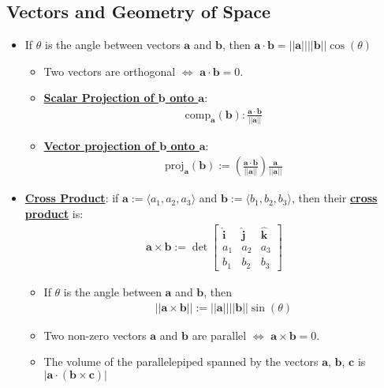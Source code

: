 \documentclass[reqno,11pt]{amsart}
\theoremstyle{definition}
\theoremstyle{remark}
\newcommand{\dfn}[1]{\underline{\textbf{#1}}}
\begin{document}
\subsection{Vectors and Geometry of Space}
\begin{itemize}[noitemsep]
	\item If $\theta$ is the angle between vectors $\mathbf{a}$ and $\mathbf{b}$, then $\mathbf{a} \cdot \mathbf{b} = ||\mathbf{a}|| || \mathbf{b} || \cos (\theta)$ 
	\begin{itemize}[noitemsep]
		\item Two vectors are orthogonal $\iff$ $\mathbf{a} \cdot \mathbf{b} = 0$. 
		\item \dfn{Scalar Projection of $\mathbf{b}$ onto $\mathbf{a}$}: 
		\begin{align}
			\text{comp}_{ \mathbf{a}} ( \mathbf{b}) : \frac{\mathbf{a} \cdot \mathbf{b} }{||\mathbf{a}|| }	
		\end{align}
		\item \dfn{Vector projection of $\mathbf{b}$ onto $\mathbf{a}$}: 
		\begin{align}
			\text{proj}_{\mathbf{a}} (\mathbf{b}) 	:= \left( \frac{\mathbf{a} \cdot \mathbf{b}}{|| \mathbf{a}|| } \right) \frac{\mathbf{a}}{|| \mathbf{a}||}
		\end{align}
	\end{itemize}
	\item \dfn{Cross Product}: if $\mathbf{a} := \langle a_1, a_2, a_3 \rangle$ and $\mathbf{b} := \langle b_1, b_2, b_3 \rangle$, then their \dfn{cross product} is:
	\begin{align}
		\mathbf{a} \times \mathbf{b} := \det \begin{bmatrix}
			\mathbf{\hat{i}} & \mathbf{\hat{j}} & \mathbf{\hat{k}} \\
			a_1 & a_2 & a_3 \\
			b_1 & b_2 & b_3 
		\end{bmatrix}	
	\end{align}	
	\begin{itemize}[noitemsep]
		\item If $\theta$ is the angle between $\mathbf{a}$ and $\mathbf{b}$, then 
		\begin{align}
			||\mathbf{a} \times \mathbf{b} || := || \mathbf{a}|| || \mathbf{b} || \sin (\theta) 	
		\end{align}
		\item Two non-zero vectors $\mathbf{a}$ and $\mathbf{b}$ are parallel $\iff$ $\mathbf{a} \times \mathbf{b} = 0$. 
		\item The volume of the parallelepiped spanned by the vectors $\mathbf{a}$, $\mathbf{b}$, $\mathbf{c}$ is $| \mathbf{a} \cdot ( \mathbf{b} \times \mathbf{c} ) | $

\end{itemize}
\end{itemize}
\end{document}
